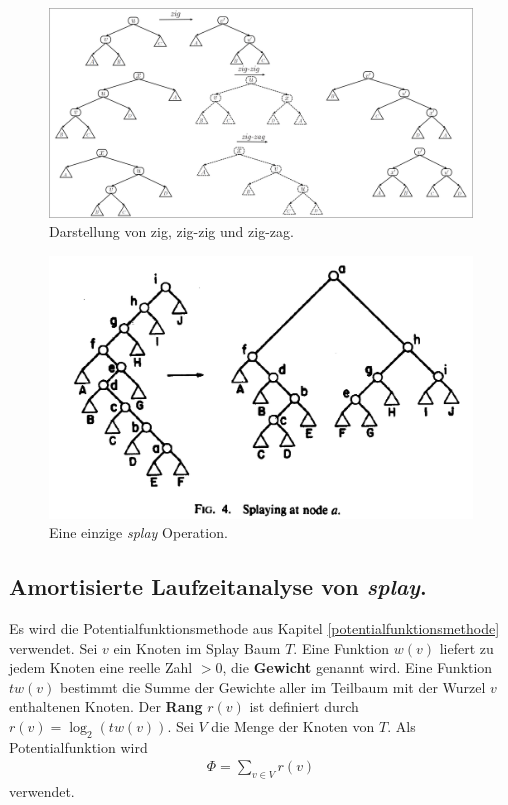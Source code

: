 \documentclass[a4paper,12pt]{article}
\begin{document}
\begin{figure}[H]
	\centering
	\includegraphics[width= 1.2\textwidth]{Medien/Splaybaum/zigZag}
	\caption{Darstellung von zig, zig-zig und zig-zag. }
	\label{fig:zigZag}
\end{figure}
\begin{figure}[H]
	\centering
	\includegraphics[width= 1\textwidth]{Medien/Splaybaum/splay}
	\caption{Eine einzige \textit{splay } Operation.\cite{splay}}
	\label{fig:splay}
\end{figure}

\subsection{Amortisierte Laufzeitanalyse von \textit{splay}.}
Es wird die Potentialfunktionsmethode aus Kapitel \ref{potentialfunktionsmethode} verwendet. Sei $v$ ein Knoten im Splay Baum $T$. Eine Funktion $w\left(v\right)$ liefert zu jedem Knoten eine reelle Zahl $>0$, die \textbf{Gewicht} genannt wird. Eine Funktion $\mathit{tw}\left(v\right)$ bestimmt die Summe der Gewichte aller im Teilbaum mit der Wurzel $v$ enthaltenen Knoten. Der \textbf{Rang}  $r\left(v\right)$ ist definiert durch $r\left(v\right) = \log_2 \left( \mathit{tw}\left(v\right)\right)$. Sei $V$ die Menge der Knoten von $T$. Als Potentialfunktion wird 
\begin{align*}
\Phi = \sum_{v \in V} r\left(v\right)
\end{align*}
verwendet.
\end{document}
